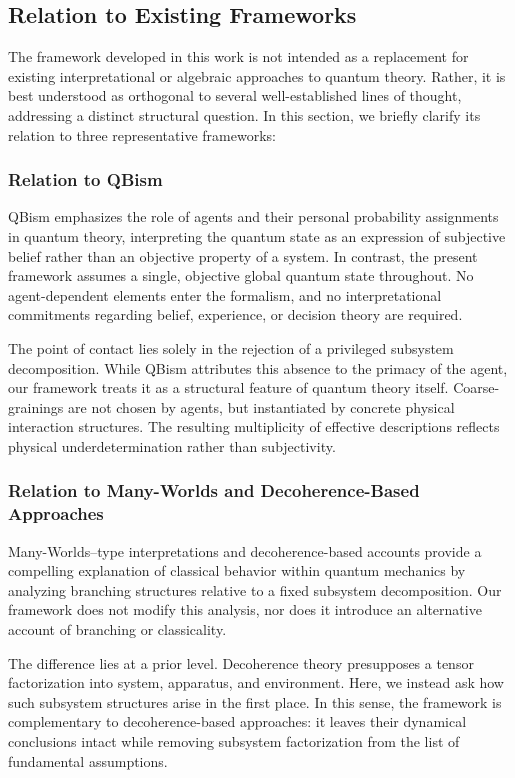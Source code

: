 \documentclass[12pt,a4paper]{article}
\begin{document}
\subsection{Relation to Existing Frameworks}

The framework developed in this work is not intended as a replacement for existing interpretational or algebraic approaches to quantum theory.
Rather, it is best understood as orthogonal to several well-established lines of thought, addressing a distinct structural question.
In this section, we briefly clarify its relation to three representative frameworks:

\subsubsection{Relation to QBism}

QBism emphasizes the role of agents and their personal probability assignments in quantum theory, interpreting the quantum state as an expression of subjective belief rather than an objective property of a system.
In contrast, the present framework assumes a single, objective global quantum state throughout.
No agent-dependent elements enter the formalism, and no interpretational commitments regarding belief, experience, or decision theory are required.

The point of contact lies solely in the rejection of a privileged subsystem decomposition.
While QBism attributes this absence to the primacy of the agent, our framework treats it as a structural feature of quantum theory itself.
Coarse-grainings are not chosen by agents, but instantiated by concrete physical interaction structures.
The resulting multiplicity of effective descriptions reflects physical underdetermination rather than subjectivity.

\subsubsection{Relation to Many-Worlds and Decoherence-Based Approaches}

Many-Worlds--type interpretations and decoherence-based accounts provide a compelling explanation of classical behavior within quantum mechanics by analyzing branching structures relative to a fixed subsystem decomposition.
Our framework does not modify this analysis, nor does it introduce an alternative account of branching or classicality.

The difference lies at a prior level.
Decoherence theory presupposes a tensor factorization into system, apparatus, and environment.
Here, we instead ask how such subsystem structures arise in the first place.
In this sense, the framework is complementary to decoherence-based approaches: it leaves their dynamical conclusions intact while removing subsystem factorization from the list of fundamental assumptions.
\end{document}
